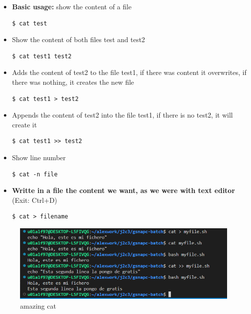 \documentclass{article}
\newenvironment{codetemplate}[1][]{%
  \mybasecolorbox[#1]
  \itshape
}{%
  \endmybasecolorbox
}
\begin{document}
\begin{itemize}
    \item \textbf{Basic usage:} show the content of a file
\begin{codetemplate}{}
\begin{verbatim}
$ cat test
\end{verbatim}
\end{codetemplate}

    \item Show the content of both files test and test2
\begin{codetemplate}{}
\begin{verbatim}
$ cat test1 test2
\end{verbatim}
\end{codetemplate}

    \item Adds the content of test2 to the file test1, if there was content it overwrites, if there was nothing, it creates the new file
\begin{codetemplate}{}
\begin{verbatim}
$ cat test1 > test2
\end{verbatim}
\end{codetemplate}

    \item Appends the content of test2 into the file test1, if there is no test2, it will create it
\begin{codetemplate}{}
\begin{verbatim}
$ cat test1 >> test2
\end{verbatim}
\end{codetemplate}

    \item Show line number
\begin{codetemplate}{}
\begin{verbatim}
$ cat -n file
\end{verbatim}
\end{codetemplate}

    \item \textbf{Writte in a file the content we want, as we were with text editor} (Exit: Ctrl+D)
\begin{codetemplate}{}
\begin{verbatim}
$ cat > filename
\end{verbatim}
\end{codetemplate}
\end{itemize}

\begin{figure}[H]
    \centering
    \includegraphics[scale=0.7]{pictures/image1.png}
    \caption{amazing cat}
\end{figure}
\end{document}
